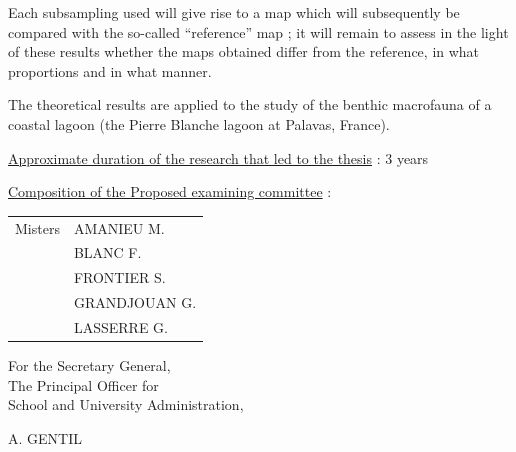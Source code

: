 Each subsampling used will give rise to a map which will subsequently be compared with the so-called ``reference'' map ; it will remain to assess in the light of these results whether the maps obtained differ from the reference, in what proportions and in what manner.

The theoretical results are applied to the study of the benthic macrofauna of a coastal lagoon (the Pierre Blanche lagoon at Palavas, France).

\uline{Approximate duration of the research that led to the thesis} : 3 years

\uline{Composition of the Proposed examining committee} : \begin{tabular}[t]{ll}
Misters & AMANIEU M.\\
& BLANC F.\\
& FRONTIER S.\\
& GRANDJOUAN G.\\
& LASSERRE G.
\end{tabular}

\begin{flushright}
For the Secretary General,\\
The Principal Officer for\\
School and University Administration,


A. GENTIL
\end{flushright}


